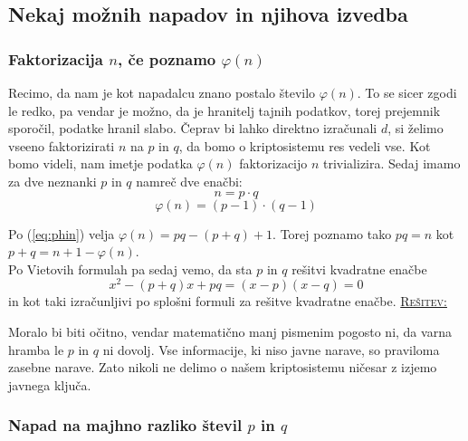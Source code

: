 \documentclass[a4paper, 12pt]{article} %
\newenvironment{matematika}[1]{
\textcolor{bostonuniversityred}{\underline{\textsc{#1:}}}
}{
}
\begin{document}
\subsection{Nekaj možnih napadov in njihova izvedba}

\subsubsection{Faktorizacija $n$, če poznamo $\varphi (n)$}

Recimo, da nam je kot napadalcu znano postalo število $\varphi (n)$. To se sicer zgodi le redko, pa vendar je možno, da je hranitelj tajnih podatkov, torej prejemnik sporočil, podatke hranil slabo. Čeprav bi lahko direktno izračunali $d$, si želimo vseeno faktorizirati $n$ na $p$ in $q$, da bomo o kriptosistemu res vedeli vse. Kot bomo videli, nam imetje podatka $\varphi (n)$ faktorizacijo $n$ trivializira.
\newline
\newline
Sedaj imamo za dve neznanki $p$ in $q$ namreč dve enačbi: 
\begin{equation}
\label{eq:n}
n = p \cdot q
\end{equation}
\begin{equation}
\label{eq:phin}
\varphi (n) = (p-1) \cdot (q-1)
\end{equation}

Po (\ref{eq:phin}) velja $\varphi (n) = pq - (p+q) + 1$. Torej poznamo tako $p q = n$ kot $p + q = n + 1 - \varphi (n)$. \\
Po Vietovih formulah pa sedaj vemo, da sta $p$ in $q$ rešitvi kvadratne enačbe
\begin{equation}
\label{eq:square}
x^2 - (p+q) x + p q = (x - p) (x - q) = 0
\end{equation}
in kot taki izračunljivi po splošni formuli za rešitve kvadratne enačbe.
\newline
\newline
\begin{matematika}{Rešitev}
Moralo bi biti očitno, vendar matematično manj pismenim pogosto ni, da varna hramba le $p$ in $q$ ni dovolj. Vse informacije, ki niso javne narave, so praviloma zasebne narave. Zato nikoli ne delimo o našem kriptosistemu ničesar z izjemo javnega ključa.
\end{matematika}

\subsubsection{Napad na majhno razliko števil $p$ in $q$}
\end{document}
